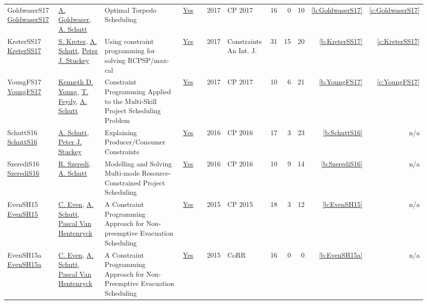 {\begin{longtable}{>{\raggedright\arraybackslash}p{3cm}>{\raggedright\arraybackslash}p{6cm}>{\raggedright\arraybackslash}p{6.5cm}rrrp{2.5cm}rrrrr}
GoldwaserS17 \href{https://doi.org/10.1007/978-3-319-66158-2_22}{GoldwaserS17} & \hyperref[auth:a194]{A. Goldwaser}, \hyperref[auth:a125]{A. Schutt} & Optimal Torpedo Scheduling & \href{../works/GoldwaserS17.pdf}{Yes} & \cite{GoldwaserS17} & 2017 & CP 2017 & 16 & 0 & 10 & \ref{b:GoldwaserS17} & \ref{c:GoldwaserS17}\\
KreterSS17 \href{https://doi.org/10.1007/s10601-016-9266-6}{KreterSS17} & \hyperref[auth:a124]{S. Kreter}, \hyperref[auth:a125]{A. Schutt}, \hyperref[auth:a126]{Peter J. Stuckey} & Using constraint programming for solving RCPSP/max-cal & \href{../works/KreterSS17.pdf}{Yes} & \cite{KreterSS17} & 2017 & Constraints An Int. J. & 31 & 15 & 20 & \ref{b:KreterSS17} & \ref{c:KreterSS17}\\
YoungFS17 \href{https://doi.org/10.1007/978-3-319-66158-2_20}{YoungFS17} & \hyperref[auth:a193]{Kenneth D. Young}, \hyperref[auth:a155]{T. Feydy}, \hyperref[auth:a125]{A. Schutt} & Constraint Programming Applied to the Multi-Skill Project Scheduling Problem & \href{../works/YoungFS17.pdf}{Yes} & \cite{YoungFS17} & 2017 & CP 2017 & 10 & 6 & 21 & \ref{b:YoungFS17} & \ref{c:YoungFS17}\\
SchuttS16 \href{https://doi.org/10.1007/978-3-319-44953-1_28}{SchuttS16} & \hyperref[auth:a125]{A. Schutt}, \hyperref[auth:a126]{Peter J. Stuckey} & Explaining Producer/Consumer Constraints & \href{../works/SchuttS16.pdf}{Yes} & \cite{SchuttS16} & 2016 & CP 2016 & 17 & 3 & 23 & \ref{b:SchuttS16} & n/a\\
SzerediS16 \href{https://doi.org/10.1007/978-3-319-44953-1_31}{SzerediS16} & \hyperref[auth:a205]{R. Szeredi}, \hyperref[auth:a125]{A. Schutt} & Modelling and Solving Multi-mode Resource-Constrained Project Scheduling & \href{../works/SzerediS16.pdf}{Yes} & \cite{SzerediS16} & 2016 & CP 2016 & 10 & 9 & 14 & \ref{b:SzerediS16} & n/a\\
EvenSH15 \href{https://doi.org/10.1007/978-3-319-23219-5_40}{EvenSH15} & \hyperref[auth:a219]{C. Even}, \hyperref[auth:a125]{A. Schutt}, \hyperref[auth:a149]{Pascal Van Hentenryck} & A Constraint Programming Approach for Non-preemptive Evacuation Scheduling & \href{../works/EvenSH15.pdf}{Yes} & \cite{EvenSH15} & 2015 & CP 2015 & 18 & 3 & 12 & \ref{b:EvenSH15} & n/a\\
EvenSH15a \href{http://arxiv.org/abs/1505.02487}{EvenSH15a} & \hyperref[auth:a219]{C. Even}, \hyperref[auth:a125]{A. Schutt}, \hyperref[auth:a149]{Pascal Van Hentenryck} & A Constraint Programming Approach for Non-Preemptive Evacuation Scheduling & \href{../works/EvenSH15a.pdf}{Yes} & \cite{EvenSH15a} & 2015 & CoRR & 16 & 0 & 0 & \ref{b:EvenSH15a} & n/a\\

\end{longtable}}

